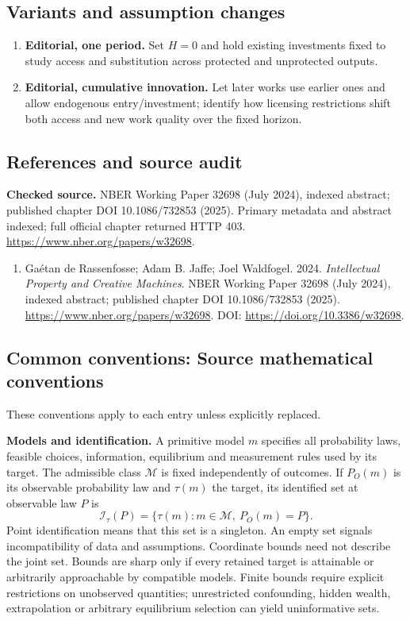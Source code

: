 \documentclass[11pt,a4paper]{article}
\begin{document}
\subsection*{Variants and assumption changes}
\begin{enumerate}
\item \textbf{Editorial, one period.} Set \(H=0\) and hold existing investments fixed to study access and substitution across protected and unprotected outputs.
\item \textbf{Editorial, cumulative innovation.} Let later works use earlier ones and allow endogenous entry/investment; identify how licensing restrictions shift both access and new work quality over the fixed horizon.
\end{enumerate}
\subsection*{References and source audit}
\textbf{Checked source.} NBER Working Paper 32698 (July 2024), indexed abstract; published chapter DOI 10.1086/732853 (2025). Primary metadata and abstract indexed; full official chapter returned HTTP 403. \url{https://www.nber.org/papers/w32698}.
\begin{enumerate}\raggedright
\item\hypertarget{definitions:source:30007698:1}{} Gaétan de Rassenfosse; Adam B. Jaffe; Joel Waldfogel. 2024. \emph{Intellectual Property and Creative Machines}. NBER Working Paper 32698 (July 2024), indexed abstract; published chapter DOI 10.1086/732853 (2025).
\url{https://www.nber.org/papers/w32698}.
DOI: \url{https://doi.org/10.3386/w32698}.
\end{enumerate}

\subsection*{Common conventions: Source mathematical conventions}

These conventions apply to each entry unless explicitly replaced.

\textbf{Models and identification.} A primitive model \(m\) specifies all probability laws, feasible choices, information, equilibrium and measurement rules used by its target. The admissible class \(\mathcal M\) is fixed independently of outcomes. If \(P_O(m)\) is its observable probability law and \(\tau(m)\) the target, its identified set at observable law \(P\) is
\[
 \mathcal I_\tau(P)=\{\tau(m):m\in\mathcal M,\ P_O(m)=P\}.
\]
Point identification means that this set is a singleton. An empty set signals incompatibility of data and assumptions. Coordinate bounds need not describe the joint set. Bounds are sharp only if every retained target is attainable or arbitrarily approachable by compatible models. Finite bounds require explicit restrictions on unobserved quantities; unrestricted confounding, hidden wealth, extrapolation or arbitrary equilibrium selection can yield uninformative sets.
\end{document}
